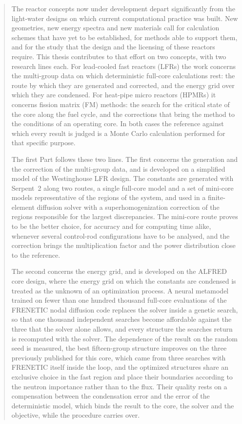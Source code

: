 \begin{abstract}
The reactor concepts now under development depart significantly from the light-water designs
on which current computational practice was built. New geometries, new energy spectra
and new materials call for calculation schemes that have yet to be established,
for methods able to support them, and for the study that the design and the
licensing of these reactors require. This thesis contributes to that effort on
two concepts, with two research lines each. For lead-cooled fast reactors
(LFRs) the work concerns the multi-group data on which deterministic full-core
calculations rest: the route by which they are generated and corrected, and the
energy grid over which they are condensed. For heat-pipe micro reactors (HPMRs)
it concerns fission matrix (FM) methods: the search for the critical state of
the core along the fuel cycle, and the corrections that bring the method to the
conditions of an operating core. In both cases the reference against which
every result is judged is a Monte Carlo calculation performed for that specific purpose.

The first Part follows these two lines. The first concerns the generation and
the correction of the multi-group data, and is developed on a simplified model
of the Westinghouse LFR design.
The constants are generated with
Serpent~2 along two routes, a single full-core model and a set of mini-core
models representative of the regions of the system, and used in a
finite-element diffusion solver with a superhomogenization correction of the
regions responsible for the largest discrepancies. The mini-core route proves
to be the better choice, for accuracy and for computing time alike, whenever several
control-rod configurations have to be analysed, and the correction brings the
multiplication factor and the power distribution close to the reference.

The second concerns the energy grid, and is developed on the ALFRED core
design, where the energy grid on which the constants are condensed is treated
as the unknown of an optimization process. A neural metamodel trained on fewer
than one hundred thousand full-core evaluations of the FRENETIC nodal diffusion
code replaces the solver inside a genetic
search, so that one thousand independent searches become affordable against the
three that the solver alone allows, and every structure the searches return is
recomputed with the solver.
The dependence of the result on the random seed is measured, the best
fifteen-group structure improves on the three previously published for this
core, which came from three searches with FRENETIC itself inside the loop, and
the optimized structures share an exclusive choice in the fast region and place
their boundaries according to the neutron importance rather than to the flux.
Their quality rests on a compensation between the condensation error and the
error of the deterministic model, which binds the result to the core, the
solver and the objective, while the procedure carries over.


\end{abstract}
